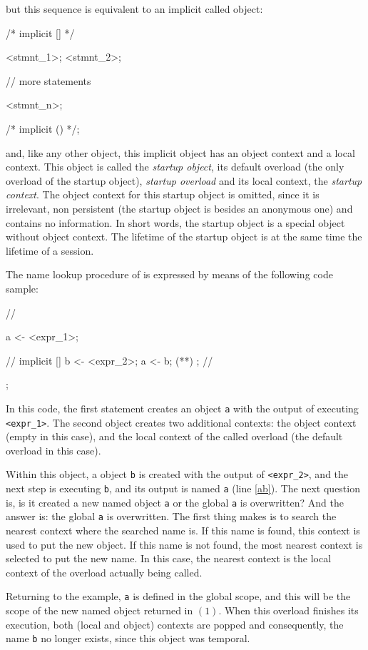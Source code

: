 \documentclass{article}
\begin{document}
but this sequence is equivalent to an implicit called object:

\begin{faupp2}
  /* implicit [] */
  {
    <stmnt_1>;
    <stmnt_2>;

    // more statements

   <stmnt_n>;
  } /* implicit () */;
\end{faupp2}

and, like any other object, this implicit object has an object context and a
local context. This object is called the \textit{startup object}, its default
overload (the only overload of the startup object), \textit{startup overload} and
its local context, the \textit{startup context}. The object context for this
startup object is omitted, since it is irrelevant, non persistent (the startup
object is besides an anonymous one) and contains no information. In short words,
the startup object is a special object without object context. The lifetime of
the startup object is at the same time the lifetime of a \fav session.

The name lookup procedure of \faupp is expressed by means of the following code
sample:

\begin{faupp2}
  // {
  a <- <expr_1>;

  // implicit []
  {
     b <- <expr_2>;
     a <- b;  (*\label{ab}*)
  };
  // };
\end{faupp2}

In this code, the first statement creates an object \texttt{a} with the output
of executing \texttt{<expr\_1>}. The second object creates two additional
contexts: the object context (empty in this case), and the local context of the
called overload (the default overload in this case).

Within this object, a object \texttt{b} is created with the output of
\texttt{<expr\_2>}, and the next step is executing \texttt{b}, and its output is
named \texttt{a} (line \ref{ab}). The next question is, is it created a new
named object \texttt{a} or the global \texttt{a} is overwritten? And the answer
is: the global \texttt{a} is overwritten. The first thing \faupp makes is to
search the nearest context where the searched name is. If this name is found,
this context is used to put the new object. If this name is not found, the most
nearest context is selected to put the new name. In this case, the nearest
context is the local context of the overload actually being called.

Returning to the example, \texttt{a} is defined in the global scope, and this
will be the scope of the new named object returned in $(1)$. When this overload
finishes its execution, both (local and object) contexts are popped and
consequently, the name \texttt{b} no longer exists, since this object was
temporal.
\end{document}
